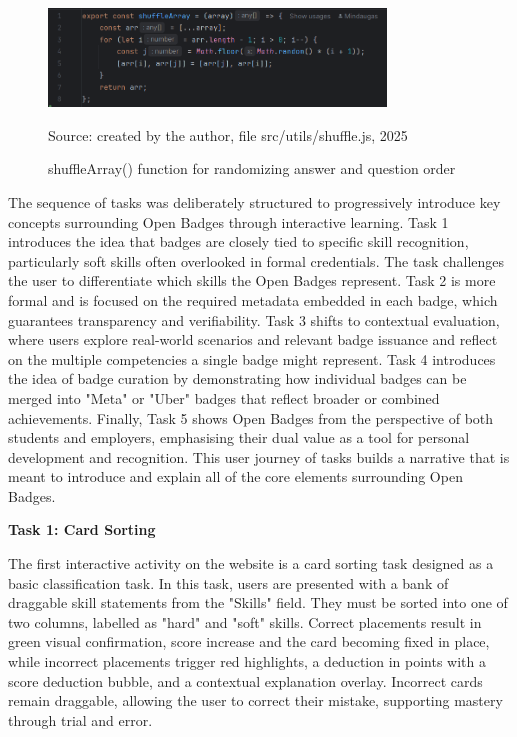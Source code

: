 \begin{figure}[hbtp]
\centering
\includegraphics[width=0.8\textwidth]{Media/shuffling.png}
\caption{shuffleArray() function for randomizing answer and question order}
\label{fig:shuffling}
{\raggedright \small{Source: created by the author, file src/utils/shuffle.js, 2025}\par}
\end{figure}

The sequence of tasks was deliberately structured to progressively introduce key concepts surrounding Open Badges through interactive learning. 
Task 1 introduces the idea that badges are closely tied to specific skill recognition, particularly soft skills often overlooked in formal credentials. 
The task challenges the user to differentiate which skills the Open Badges represent. 
Task 2 is more formal and is focused on the required metadata embedded in each badge, which guarantees transparency and verifiability. 
Task 3 shifts to contextual evaluation, where users explore real-world scenarios and relevant badge issuance and reflect on the multiple competencies a single badge might represent. 
Task 4 introduces the idea of badge curation by demonstrating how individual badges can be merged into "Meta" or "Uber" badges that reflect broader or combined achievements. 
Finally, Task 5 shows Open Badges from the perspective of both students and employers, emphasising their dual value as a tool for personal development and recognition. 
This user journey of tasks builds a narrative that is meant to introduce and explain all of the core elements surrounding Open Badges.


\textbf{Task 1: Card Sorting}

The first interactive activity on the website is a card sorting task designed as a basic classification task. 
In this task, users are presented with a bank of draggable skill statements from the "Skills" field.
They must be sorted into one of two columns, labelled as "hard" and "soft" skills. 
Correct placements result in green visual confirmation, score increase and the card becoming fixed in place, while incorrect placements trigger red highlights, a deduction in points with a score deduction bubble, and a contextual explanation overlay. 
Incorrect cards remain draggable, allowing the user to correct their mistake, supporting mastery through trial and error.

